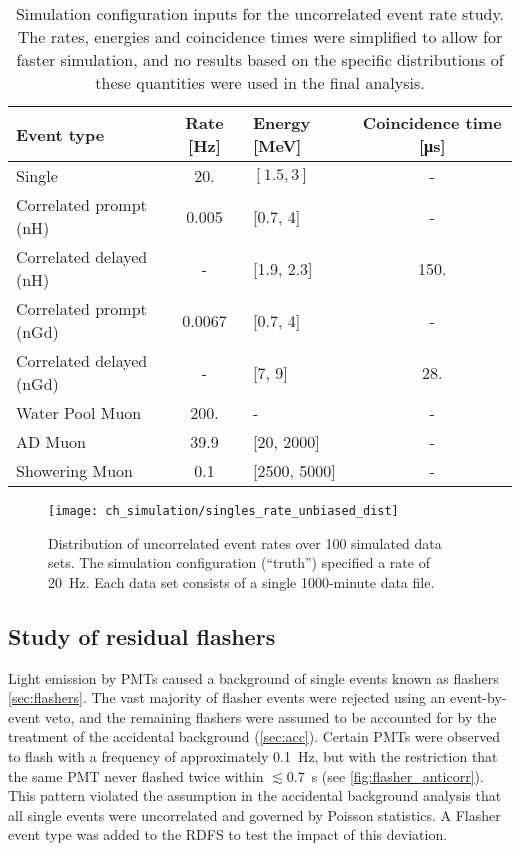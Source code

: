 \begin{table}[ht]
    \centering
    \begin{tabular}[t]{lSlS}
        \toprule
        Event type & {Rate [\si{\Hz}]} & Energy [\si{\MeV}] & {Coincidence time [\si{\us}]}\\
        \midrule
        Single & 20. & $[\num{1.5}, \num{3}]$ & {-}\\
        Correlated prompt (nH) & 0.005 & [0.7, 4] & {-} \\
        Correlated delayed (nH) & {-} & [1.9, 2.3] & 150. \\
        Correlated prompt (nGd) & 0.0067 & [0.7, 4] & {-} \\
        Correlated delayed (nGd) & {-} & [7, 9] & 28. \\
        Water Pool Muon & 200. & - & {-} \\
        AD Muon & 39.9 & [\num{20}, \num{2000}] & {-}\\
        Showering Muon & 0.1 & [\num{2500}, \num{5000}] & {-}\\
        \bottomrule
    \end{tabular}
    \caption[Uncorrelated event simulation inputs]{
        Simulation configuration inputs for the uncorrelated event rate study.
        The rates, energies and coincidence times were simplified
        to allow for faster simulation,
        and no results based on the specific distributions of these quantities
        were used in the final analysis.
    }
    \label{tab:toymc_singles_config}
\end{table}

\begin{figure}
    \centering
    \texttt{[image: ch\_simulation/singles\_rate\_unbiased\_dist]}
    \caption[Extracted simulated uncorrelated event rates]{
        Distribution of uncorrelated event rates over 100 simulated data sets.
        The simulation configuration (``truth'') specified a rate of \SI{20}{\Hz}.
        Each data set consists of a single 1000-minute data file.
    }
    \label{fig:toymc_singles_dist}
\end{figure}

\subsection{Study of residual flashers}
\label{subsec:toymc_flashers}

Light emission by PMTs caused a background of single events
known as flashers \cref{sec:flashers}.
The vast majority of flasher events were rejected using an event-by-event veto,
and the remaining flashers were assumed to be accounted for
by the treatment of the accidental background (\cref{sec:acc}).
Certain PMTs were observed to flash with a frequency
of approximately \SI{0.1}{\Hz},
but with the restriction that
the same PMT never flashed twice within $\lesssim$\SI{0.7}{\s}
(see \cref{fig:flasher_anticorr}).
This pattern violated the assumption in the accidental background analysis
that all single events were uncorrelated and governed by Poisson statistics.
A Flasher event type was added to the RDFS to test the impact of this deviation.

